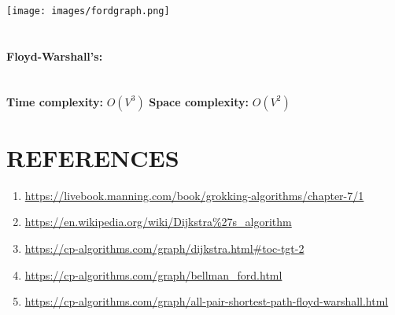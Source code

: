 \documentclass[10pt]{article}
\begin{document}
\begin{multicols*}{2}
\texttt{[image: images/fordgraph.png]}\\\\


\paragraph{Floyd-Warshall's:} \\
\textbf{Time complexity: } \(O(V^3)\)
\textbf{Space complexity: } \(O(V^2)\)



\section*{REFERENCES}

\begin{enumerate}
\item	\url{https://livebook.manning.com/book/grokking-algorithms/chapter-7/1}
\item	\url{https://en.wikipedia.org/wiki/Dijkstra%27s_algorithm}
\item	\url{https://cp-algorithms.com/graph/dijkstra.html#toc-tgt-2}
\item	\url{https://cp-algorithms.com/graph/bellman_ford.html}
\item	\url{https://cp-algorithms.com/graph/all-pair-shortest-path-floyd-warshall.html}

\end{enumerate}


\end{multicols*}
\clearpage

	
\end{document}
